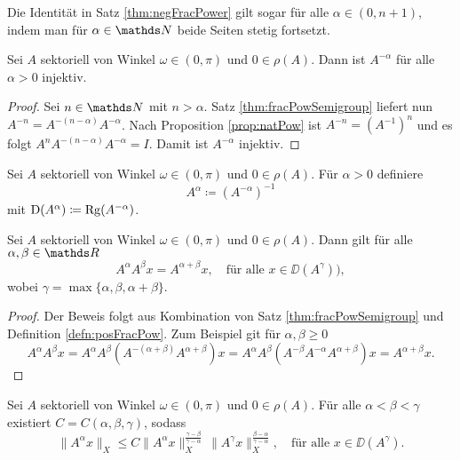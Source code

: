 \begin{kor}
  \label{kor:negFracPower}
  Die Identität in Satz \ref{thm:negFracPower} gilt sogar für alle $\alpha \in (0,n+1)$, indem man für $\alpha \in \N$ beide Seiten stetig fortsetzt.
\end{kor}

\begin{prop}
  Sei $A$ sektoriell von Winkel $\omega \in (0,\pi)$ und $0 \in \rho(A)$.
  Dann ist $A^{-\alpha}$ für alle $\alpha > 0$ injektiv.
\end{prop}

\begin{proof}
  Sei $n \in \N$ mit $n > \alpha$.
  Satz \ref{thm:fracPowSemigroup} liefert nun $A^{-n} = A^{-(n - \alpha)}A^{-\alpha}$.
  Nach Proposition \ref{prop:natPow} ist $A^{-n} = (A^{-1})^n$ und es folgt $A^n A^{-(n - \alpha)} A^{-\alpha} = I$.
  Damit ist $A^{-\alpha}$ injektiv.
\end{proof}

\begin{defn}
  \label{defn:posFracPow}
  Sei $A$ sektoriell von Winkel $\omega \in (0,\pi)$ und $0 \in \rho(A)$.
  Für $\alpha > 0$ definiere 
  $$
  A^\alpha \coloneqq (A^{-\alpha})^{-1}
  $$
  mit $\mathrm{D}(A^\alpha) \coloneqq \operatorname{Rg}(A^{-\alpha})$.
\end{defn}

\begin{thm}
  Sei $A$ sektoriell von Winkel $\omega \in (0,\pi)$ und $0 \in \rho(A)$.
  Dann gilt für alle $\alpha, \beta \in \R$
  $$
    A^\alpha A^\beta x = A^{\alpha + \beta} x, \quad\text{für alle } x \in \DD(A^\gamma)),
  $$
  wobei $\gamma = \max\{\alpha, \beta, \alpha + \beta\}$.
\end{thm}

\begin{proof}
  Der Beweis folgt aus Kombination von Satz \ref{thm:fracPowSemigroup} und Definition \ref{defn:posFracPow}.
  Zum Beispiel git für $\alpha, \beta \geq 0$
  $$
  A^\alpha A^\beta x 
  = A^\alpha A^\beta (A^{-(\alpha + \beta)} A^{\alpha + \beta}) x
  = A^\alpha A^\beta (A^{-\beta} A^{-\alpha} A^{\alpha + \beta} ) x 
  = A^{\alpha + \beta} x.
  $$
\end{proof}

\begin{thm}[Momentenungleichung]
  Sei $A$ sektoriell von Winkel $\omega \in (0,\pi)$ und $0 \in \rho(A)$.
  Für alle $\alpha < \beta < \gamma$ existiert $C = C(\alpha, \beta, \gamma)$, sodass
  $$
  \| A^\alpha x\|_X \leq C \|A^\alpha x\|_X^{\frac{\gamma - \beta}{\gamma - \alpha}} \, \|A^\gamma x \|_X^{\frac{\beta - \alpha}{\gamma - \alpha}}, \quad\text{für alle }x \in \DD(A^\gamma).
  $$
\end{thm}

